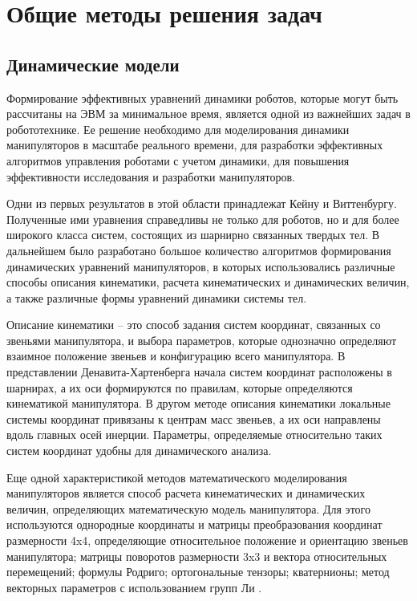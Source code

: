 \section{Общие методы решения задач}
\subsection{Динамические модели}

Формирование эффективных уравнений динамики роботов, которые могут быть рассчитаны на ЭВМ за минимальное время, является одной из важнейших задач в робототехнике. Ее решение необходимо для моделирования динамики манипуляторов в масштабе реального времени, для разработки эффективных алгоритмов управления роботами с учетом динамики, для повышения эффективности исследования и разработки манипуляторов.

Одни из первых результатов в этой области принадлежат Кейну и Виттенбургу. Полученные ими уравнения справедливы не только для роботов, но и для более широкого класса систем, состоящих из шарнирно связанных твердых тел. В дальнейшем было разработано большое количество алгоритмов формирования динамических уравнений манипуляторов, в которых использовались различные способы описания кинематики, расчета кинематических и динамических величин, а также различные формы уравнений динамики системы тел.

Описание кинематики – это способ задания систем координат, связанных со звеньями манипулятора, и выбора параметров, которые однозначно определяют взаимное положение звеньев и конфигурацию всего манипулятора. В представлении Денавита-Хартенберга начала систем координат расположены в шарнирах, а их оси формируются по правилам, которые определяются кинематикой манипулятора. В другом методе описания кинематики локальные системы координат привязаны к центрам масс звеньев, а их оси направлены вдоль главных осей инерции. Параметры, определяемые относительно таких систем координат удобны для динамического анализа.

Еще одной характеристикой методов математического моделирования манипуляторов является способ расчета кинематических и динамических величин, определяющих математическую модель манипулятора. Для этого используются однородные координаты и матрицы преобразования координат размерности 4x4, определяющие относительное положение и ориентацию звеньев манипулятора; матрицы поворотов размерности 3x3 и вектора относительных перемещений; формулы Родриго; ортогональные тензоры; кватернионы; метод векторных параметров с использованием групп Ли .

